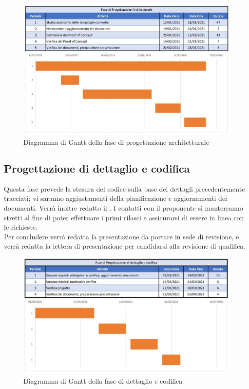 \documentclass[../piano_di_progetto.tex]{subfiles}
\begin{document}
\begin{figure}[H]
\centering
\includegraphics[width=12cm]{img/fase_prog_archit}
\caption{Diagramma di Gantt della fase di progettazione architetturale}
\end{figure}


\subsection{Progettazione di dettaglio e codifica}%
\label{sub:prog_dett}
Questa fase prevede la stesura del codice sulla base dei dettagli precedentemente tracciati; vi saranno aggiustamenti della pianificazione e aggiornamenti dei documenti. Verrà inoltre redatto il . I contatti con il proponente si manterranno stretti al fine di poter effettuare i primi rilasci e assicurarsi di essere in linea con le richieste.\\
Per concludere verrà redatta la presentazione da portare in sede di revisione, e verrà redatta la lettera di presentazione per candidarsi alla revisione di qualifica. 

\begin{figure}[H]
\centering
\includegraphics[width=12cm]{img/fase_dett_cod}
\caption{Diagramma di Gantt della fase di dettaglio e codifica}
\end{figure}
\end{document}

